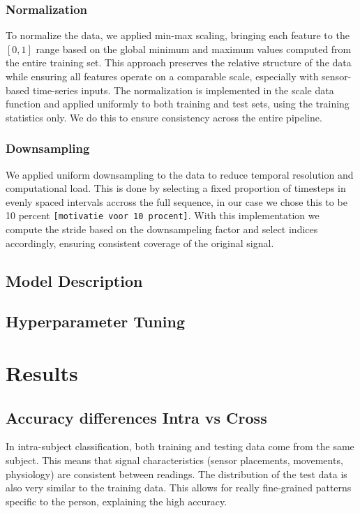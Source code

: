 \documentclass[conference]{IEEEtran}
\begin{document}
\subsubsection{Normalization}
To normalize the data, we applied min-max scaling, bringing each feature to the $[0,1]$ range based on the global minimum and maximum values computed from the entire training set.
 This approach preserves the relative structure of the data while ensuring all features operate on a comparable scale, especially with sensor-based time-series inputs.
The normalization is implemented in the scale data function and applied uniformly to both training and test sets, using the training statistics only. We do this to ensure consistency across the entire pipeline.

\subsubsection{Downsampling}
We applied uniform downsampling to the data to reduce temporal resolution and computational load. 
This is done by selecting a fixed proportion of timesteps in evenly spaced intervals accross the full sequence, in our case we chose this to be 10 percent \texttt{[motivatie voor 10 procent]}.
 With this implementation we compute the stride based on the downsampeling factor and select indices accordingly, ensuring consistent coverage of the original signal. 

\subsection{Model Description}


\subsection{Hyperparameter Tuning}

\section{Results}

\subsection{Accuracy differences Intra vs Cross}
In intra-subject classification, both training and testing data come from the same subject. This means that signal characteristics (sensor placements, movements, physiology) are consistent between readings. The distribution of the test data is also very similar to the training data. This allows for really fine-grained patterns specific to the person, explaining the high accuracy. 
\end{document}
